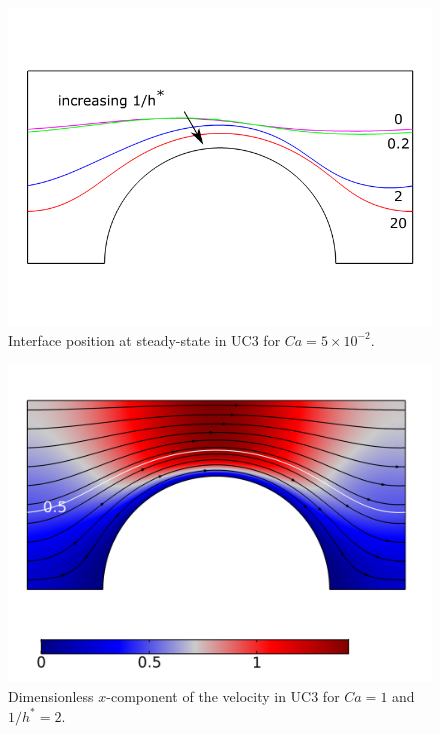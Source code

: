 \documentclass[]{article}
\begin{document}
\begin{figure}
\hypertarget{fig:interfaceCa005}{%
\centering
\includegraphics{figures/pdf/interfaceCa005.pdf}
\caption{Interface position at steady-state in UC3 for
\(Ca=5\times10^{-2}\).}\label{fig:interfaceCa005}
}
\end{figure}

\begin{figure}
\hypertarget{fig:UvelocityCa1LH2}{%
\centering
\includegraphics{figures/png/Uvelocity_Ca1LH2.png}
\caption{Dimensionless \(x\)-component of the velocity in UC3 for
\(Ca=1\) and \(1/h^*=2\).}\label{fig:UvelocityCa1LH2}
}
\end{figure}
\end{document}
